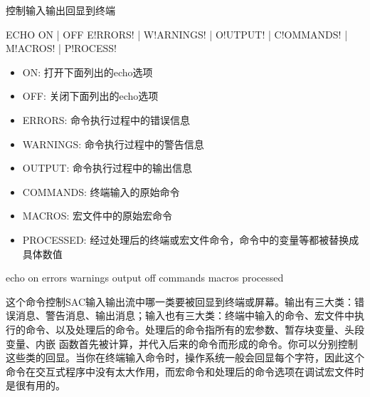 \label{cmd:echo}

控制输入输出回显到终端

\begin{SACSTX}
ECHO ON | OFF E!RRORS! | W!ARNINGS! | O!UTPUT! | C!OMMANDS! | M!ACROS! | P!ROCESS!
\end{SACSTX}

\begin{itemize}
\item ON: 打开下面列出的echo选项
\item OFF: 关闭下面列出的echo选项 
\item ERRORS: 命令执行过程中的错误信息 
\item WARNINGS: 命令执行过程中的警告信息 
\item OUTPUT: 命令执行过程中的输出信息  
\item COMMANDS: 终端输入的原始命令 
\item MACROS: 宏文件中的原始宏命令 
\item PROCESSED: 经过处理后的终端或宏文件命令，命令中的变量等都被替换成具体数值
\end{itemize}

\begin{SACDFT}
echo on errors warnings output off commands macros processed
\end{SACDFT}

这个命令控制SAC输入输出流中哪一类要被回显到终端或屏幕。输出有三大类：错误消息、警告消息、输出消息；输入也有三大类：终端中输入的命令、宏文件中执行的命令、以及处理后的命令。处理后的命令指所有的宏参数、暂存块变量、头段变量、内嵌	函数首先被计算，并代入后来的命令而形成的命令。你可以分别控制这些类的回显。当你在终端输入命令时，操作系统一般会回显每个字符，因此这个命令在交互式程序中没有太大作用，而宏命令和处理后的命令选项在调试宏文件时是很有用的。
